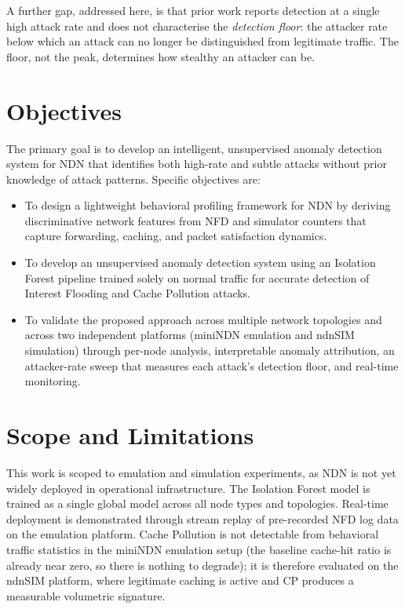 \documentclass[12pt]{report}
\begin{document}
A further gap, addressed here, is that prior work reports detection at a single high attack rate and does not characterise the \emph{detection floor}: the attacker rate below which an attack can no longer be distinguished from legitimate traffic. The floor, not the peak, determines how stealthy an attacker can be.

\section{Objectives}

The primary goal is to develop an intelligent, unsupervised anomaly detection system for NDN that identifies both high-rate and subtle attacks without prior knowledge of attack patterns. Specific objectives are:

\begin{itemize}
    \item To design a lightweight behavioral profiling framework for NDN by deriving discriminative network features from NFD and simulator counters that capture forwarding, caching, and packet satisfaction dynamics.

    \item To develop an unsupervised anomaly detection system using an Isolation Forest pipeline trained solely on normal traffic for accurate detection of Interest Flooding and Cache Pollution attacks.

    \item To validate the proposed approach across multiple network topologies and across two independent platforms (miniNDN emulation and ndnSIM simulation) through per-node analysis, interpretable anomaly attribution, an attacker-rate sweep that measures each attack's detection floor, and real-time monitoring.
\end{itemize}

\section{Scope and Limitations}

This work is scoped to emulation and simulation experiments, as NDN is not yet widely deployed in operational infrastructure. The Isolation Forest model is trained as a single global model across all node types and topologies. Real-time deployment is demonstrated through stream replay of pre-recorded NFD log data on the emulation platform. Cache Pollution is not detectable from behavioral traffic statistics in the miniNDN emulation setup (the baseline cache-hit ratio is already near zero, so there is nothing to degrade); it is therefore evaluated on the ndnSIM platform, where legitimate caching is active and CP produces a measurable volumetric signature.
\end{document}
